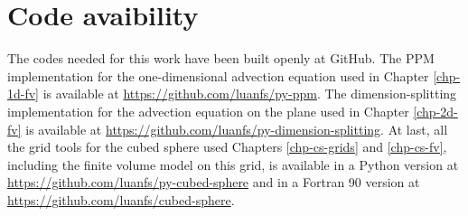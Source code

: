 \chapter{Code avaibility}
\label{anexo-code}

The codes needed for this work have been built openly at GitHub. 
The PPM implementation for the one-dimensional advection equation used in Chapter 
\ref{chp-1d-fv} is available at \url{https://github.com/luanfs/py-ppm}.
The dimension-splitting implementation for the advection equation on the plane used in 
Chapter \ref{chp-2d-fv} is available at \url{https://github.com/luanfs/py-dimension-splitting}.
At last, all the grid tools for the cubed sphere used Chapters \ref{chp-cs-grids} and \ref{chp-cs-fv},
including the finite volume model on this grid, is available in a Python version 
at \url{https://github.com/luanfs/py-cubed-sphere} and in a Fortran 90 version at
\url{https://github.com/luanfs/cubed-sphere}.


